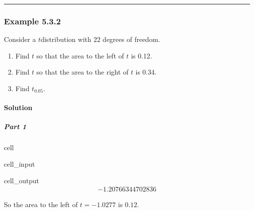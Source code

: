 \documentclass[letterpaper,10pt,english]{jupyterBook}
\begin{document}
\bigskip\hrule\bigskip



\subsubsection{Example 5.3.2}
\label{\detokenize{Ch5 Confidence Intervals/5.3 Student's t-Distribution:example-5-3-2}}
\sphinxAtStartPar
Consider a \(t\)\sphinxhyphen{}distribution with \(22\) degrees of freedom.
\begin{enumerate}
%
\item {} 
\sphinxAtStartPar
Find \(t\) so that the area to the left of \(t\) is 0.12.

\item {} 
\sphinxAtStartPar
Find \(t\) so that the area to the right of \(t\) is 0.34.

\item {} 
\sphinxAtStartPar
Find \(t_{0.05}\).

\end{enumerate}


\paragraph{Solution}
\label{\detokenize{Ch5 Confidence Intervals/5.3 Student's t-Distribution:id2}}

\subparagraph{Part 1}
\label{\detokenize{Ch5 Confidence Intervals/5.3 Student's t-Distribution:id3}}
\begin{sphinxuseclass}{cell}\begin{sphinxVerbatimInput}

\begin{sphinxuseclass}{cell_input}
\begin{sphinxVerbatim}[commandchars=\\\{\}]
\end{sphinxVerbatim}

\end{sphinxuseclass}\end{sphinxVerbatimInput}
\begin{sphinxVerbatimOutput}

\begin{sphinxuseclass}{cell_output}\begin{equation*}
\begin{split}-1.20766344702836\end{split}
\end{equation*}
\end{sphinxuseclass}\end{sphinxVerbatimOutput}

\end{sphinxuseclass}
\sphinxAtStartPar
So the area to the left of \(t = -1.0277\) is \(0.12\).
\end{document}
